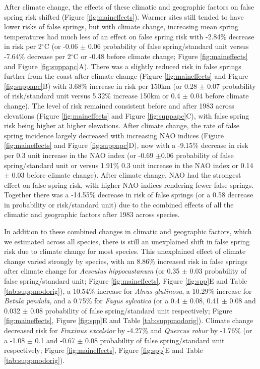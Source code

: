 \documentclass{article}\usepackage[]{graphicx}\usepackage[]{color}
\begin{document}
After climate change, the effects of these climatic and geographic factors on false spring risk shifted (Figure \ref{fig:maineffects}). Warmer sites still tended to have lower risks of false springs, but with climate change, increasing mean spring temperatures had much less of an effect on false spring risk with -2.84\% decrease in risk per 2$^{\circ}$C (or -0.06 $\pm$ 0.06 probability of false spring/standard unit versus -7.64\% decrease per 2$^{\circ}$C or -0.48 before climate change; Figure \ref{fig:maineffects} and Figure \ref{fig:suppapc}A). There was a slightly reduced risk in false springs further from the coast after climate change (Figure \ref{fig:maineffects} and Figure \ref{fig:suppapc}B) with 3.68\% increase in risk per 150km (or 0.28 $\pm$ 0.07 probability of risk/standard unit versus 5.32\% increase 150km or 0.4 $\pm$ 0.04 before climate change). The level of risk remained consistent before and after 1983 across elevations (Figure \ref{fig:maineffects} and Figure \ref{fig:suppapc}C), with false spring risk being higher at higher elevations. After climate change, the rate of false spring incidence largely decreased with increasing NAO indices (Figure \ref{fig:maineffects} and Figure \ref{fig:suppapc}D), now with a -9.15\% decrease in risk per 0.3 unit increase in the NAO index (or -0.69 $\pm$0.06 probability of false spring/standard unit or versus 1.91\% 0.3 unit increase in the NAO index or 0.14 $\pm$ 0.03 before climate change). After climate change, NAO had the strongest effect on false spring risk, with higher NAO indices rendering fewer false springs. Together there was a -14.55\% decrease in risk of false springs (or a 0.58 decrease in probability or risk/standard unit) due to the combined effects of all the climatic and geographic factors after 1983 across species. %

In addition to these combined changes in climatic and geographic factors, which we estimated across all species, there is still an unexplained shift in false spring risk due to climate change for most species. This unexplained effect of climate change varied strongly by species, with an 8.86\% increased risk in false springs after climate change for \textit{Aesculus hippocastanum} (or 0.35 $\pm$ 0.03 probability of false spring/standard unit; Figure \ref{fig:maineffects}, Figure \ref{fig:spp}E and Table \ref{tab:suppmodorig}), a 10.54\% increase for \textit{Alnus glutinosa}, a 10.29\% increase for \textit{Betula pendula}, and a 0.75\% for \textit{Fagus sylvatica} (or a 0.4 $\pm$ 0.08, 0.41 $\pm$ 0.08 and 0.032 $\pm$ 0.08 probability of false spring/standard unit respectively; Figure \ref{fig:maineffects}, Figure \ref{fig:spp}E and Table \ref{tab:suppmodorig}). Climate change decreased risk for \textit{Fraxinus excelsior} by -4.27\% and \textit{Quercus robur} by -1.76\% (or a -1.08 $\pm$ 0.1 and -0.67 $\pm$ 0.08 probability of false spring/standard unit respectively; Figure \ref{fig:maineffects}, Figure \ref{fig:spp}E and Table \ref{tab:suppmodorig}).
\end{document}
